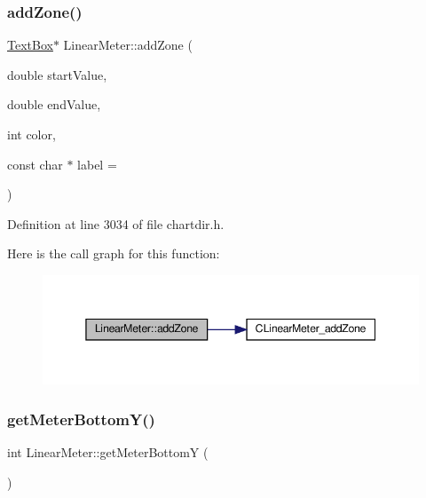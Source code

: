 \subsubsection{\texorpdfstring{add\+Zone()}{addZone()}}
{\footnotesize\ttfamily \hyperlink{class_text_box}{Text\+Box}$\ast$ Linear\+Meter\+::add\+Zone (\begin{DoxyParamCaption}\item[{double}]{start\+Value,  }\item[{double}]{end\+Value,  }\item[{int}]{color,  }\item[{const char $\ast$}]{label = {} }\end{DoxyParamCaption})\hspace{0.3cm}{\ttfamily [inline]}}



Definition at line 3034 of file chartdir.\+h.

Here is the call graph for this function\+:
\nopagebreak
\begin{figure}[H]
\begin{center}
\leavevmode
\includegraphics[width=345pt]{class_linear_meter_adf04c08cb83e4f3d71ed056fcafff552_cgraph}
\end{center}
\end{figure}
\mbox{\label{class_linear_meter_a75d8fef2615264355a45101a42c23298}} 
\subsubsection{\texorpdfstring{get\+Meter\+Bottom\+Y()}{getMeterBottomY()}}
{\footnotesize\ttfamily int Linear\+Meter\+::get\+Meter\+BottomY (\begin{DoxyParamCaption}{ }\end{DoxyParamCaption})\hspace{0.3cm}{\ttfamily [inline]}}



